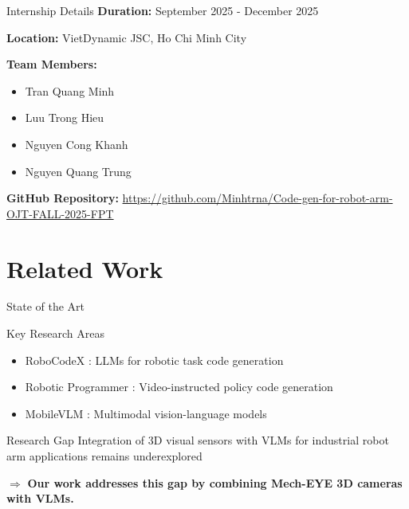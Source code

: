 \documentclass{beamer}
\begin{document}
\begin{frame}{Internship Details}
    \textbf{Duration:} September 2025 - December 2025
    
    \textbf{Location:} VietDynamic JSC, Ho Chi Minh City
    
    \textbf{Team Members:}
    \begin{itemize}
        \item Tran Quang Minh
        \item Luu Trong Hieu  
        \item Nguyen Cong Khanh
        \item Nguyen Quang Trung
    \end{itemize}
    
    \textbf{GitHub Repository:} \url{https://github.com/Minhtrna/Code-gen-for-robot-arm-OJT-FALL-2025-FPT}
    
\end{frame}

\section{Related Work}

\begin{frame}{State of the Art}
    \begin{block}{Key Research Areas}
        \begin{itemize}
            \item \alert{RoboCodeX} \cite{mu2024robocodex}: LLMs for robotic task code generation
            \item \alert{Robotic Programmer} \cite{xie2025robotic}: Video-instructed policy code generation
            \item \alert{MobileVLM} \cite{chu2023mobilevlm}: Multimodal vision-language models
        \end{itemize}
    \end{block}
    
    \begin{alertblock}{Research Gap}
        Integration of \alert{3D visual sensors} with VLMs for industrial robot arm applications remains underexplored
    \end{alertblock}
    
    $\Rightarrow$ \textbf{Our work addresses this gap by combining Mech-EYE 3D cameras with VLMs.}
    
\end{frame}
         
\end{document}
